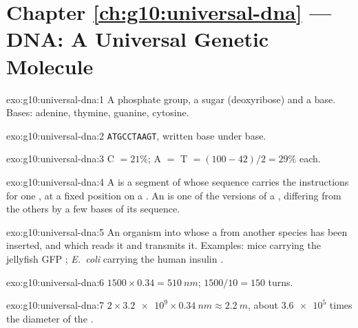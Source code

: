 \section*{Chapter \ref{ch:g10:universal-dna} --- DNA: A Universal Genetic Molecule}

\begin{solution}{exo:g10:universal-dna:1}
A phosphate group, a sugar (deoxyribose) and a base. Bases: adenine,
thymine, guanine, cytosine.
\end{solution}

\begin{solution}{exo:g10:universal-dna:2}
\texttt{ATGCCTAAGT}, written base under base.
\end{solution}

\begin{solution}{exo:g10:universal-dna:3}
C $= 21\%$; A $=$ T $= (100 - 42)/2 = 29\%$ each.
\end{solution}

\begin{solution}{exo:g10:universal-dna:4}
A  is a segment of  whose sequence carries the instructions for
one , at a fixed position on a . An  is one of
the versions of a , differing from the others by a few bases of
its sequence.
\end{solution}

\begin{solution}{exo:g10:universal-dna:5}
An organism into whose  a  from another species has been
inserted, and which reads it and transmits it. Examples: mice carrying
the jellyfish GFP ; \emph{E.~coli} carrying the human insulin .
\end{solution}

\begin{solution}{exo:g10:universal-dna:6}
$1500 \times 0.34 = \qty{510}{nm}$; $1500/10 = 150$ turns.
\end{solution}

\begin{solution}{exo:g10:universal-dna:7}
$2 \times \num{3.2e9} \times \qty{0.34}{nm} \approx \qty{2.2}{m}$,
about $\num{3.6e5}$ times the diameter of the .
\end{solution}


